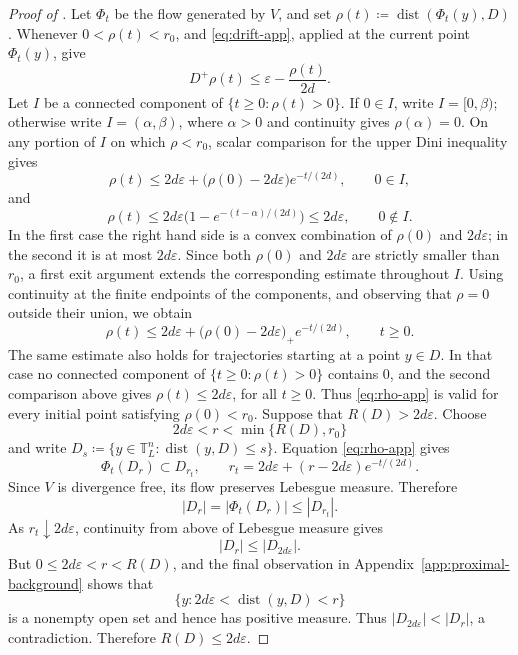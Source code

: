 \documentclass[10pt,a4paper]{amsart}
\newcommand{\Dplus}{D^+}
\newcommand{\T}{\mathbb T}
\newcommand{\dist}{\operatorname{dist}}
\begin{document}
\begin{proof}[Proof of ]
Let $\Phi_t$ be the flow generated by $V$, and set 
$\rho(t)\coloneqq\dist(\Phi_t(y),D)$. 
Whenever $0<\rho(t)<r_0$,
 and \eqref{eq:drift-app},
applied at the current point $\Phi_t(y)$, give
\[
  \Dplus\rho(t)
  \le\varepsilon-\frac{\rho(t)}{2d}.
\]
Let $I$ be a connected component of
$\{t\ge0:\rho(t)>0\}$. If $0\in I$, write $I=[0,\beta)$;
otherwise write $I=(\alpha,\beta)$, where $\alpha>0$ and continuity
gives $\rho(\alpha)=0$. On any portion of $I$ on which
$\rho<r_0$, scalar comparison for the upper Dini inequality gives
\[
  \rho(t)
  \le
  2d\varepsilon+
  \bigl(\rho(0)-2d\varepsilon\bigr)e^{-t/(2d)},
  \qquad 0\in I,
\]
and
\[
  \rho(t)
  \le
  2d\varepsilon
  \bigl(1-e^{-(t-\alpha)/(2d)}\bigr)
  \le2d\varepsilon,
  \qquad 0\notin I.
\]
In the first case the right hand side is a convex combination of
$\rho(0)$ and $2d\varepsilon$; in the second it is at most
$2d\varepsilon$. Since both $\rho(0)$ and $2d\varepsilon$ are
strictly smaller than $r_0$, a first exit argument extends the
corresponding estimate throughout $I$. Using continuity at the finite
endpoints of the components, and observing that $\rho=0$ outside their
union, we obtain
\begin{equation}\label{eq:rho-app}
  \rho(t)
  \le
  2d\varepsilon+
  \bigl(\rho(0)-2d\varepsilon\bigr)_+e^{-t/(2d)},
  \qquad t\ge0.
\end{equation}
The same estimate also holds for trajectories starting at a point
$y\in D$. In that case no connected component of
$\{t\ge0:\rho(t)>0\}$ contains $0$, and the second comparison above
gives
  $\rho(t)\le 2d\varepsilon$, 
  for all $t\ge0$.
Thus \eqref{eq:rho-app} is valid for every initial point satisfying
$\rho(0)<r_0$.
Suppose that $R(D)>2d\varepsilon$. Choose
\[
  2d\varepsilon<r<\min\{R(D),r_0\}
\]
and write
  $D_s\coloneqq\{y\in\T_L^n:\dist(y,D)\le s\}$.
Equation \eqref{eq:rho-app} gives
\[
  \Phi_t(D_r)\subset D_{r_t},
  \qquad
  r_t=2d\varepsilon+
      (r-2d\varepsilon)e^{-t/(2d)}.
\]
Since $V$ is divergence free, its flow preserves Lebesgue measure.
Therefore
\[
  |D_r|
  =
  |\Phi_t(D_r)|
  \le
  |D_{r_t}|.
\]
As $r_t\downarrow2d\varepsilon$, continuity from above of Lebesgue
measure gives
\[
  |D_r|\le|D_{2d\varepsilon}|.
\]
But $0\le2d\varepsilon<r<R(D)$, and the final observation in
Appendix~\ref{app:proximal-background} shows that
\[
  \{y:2d\varepsilon<\dist(y,D)<r\}
\]
is a nonempty open set and hence has positive measure. Thus
  $|D_{2d\varepsilon}|<|D_r|$,
a contradiction. Therefore $R(D)\le2d\varepsilon$.
\end{proof}
\end{document}
